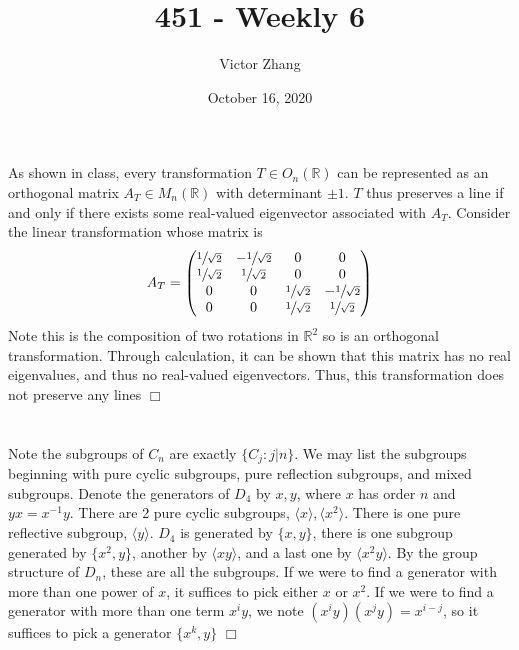 \documentclass{article}
\title{451 - Weekly 6}
\author{Victor Zhang}
\date{October 16, 2020}
\begin{document}
\maketitle

\section{}
As shown in class, every transformation $T \in O_n(\mathbb{R})$ can be represented as an orthogonal matrix $A_T \in M_n(\mathbb{R})$ with determinant $\pm 1$. $T$ thus preserves a line if and only if there exists some real-valued eigenvector associated with $A_T$. Consider the linear transformation whose matrix is
\begin{equation*}
A_T = \left(\begin{matrix}
\sfrac{1}{\sqrt{2}} & -\sfrac{1}{\sqrt{2}} & 0 & 0\\
\sfrac{1}{\sqrt{2}} & \sfrac{1}{\sqrt{2}} & 0 & 0\\
0 & 0 & \sfrac{1}{\sqrt{2}} & -\sfrac{1}{\sqrt{2}}\\
0 & 0 & \sfrac{1}{\sqrt{2}} & \sfrac{1}{\sqrt{2}}\\
\end{matrix}
\right)
\end{equation*}
Note this is the composition of two rotations in $\mathbb{R}^2$ so is an orthogonal transformation. Through calculation, it can be shown that this matrix has no real eigenvalues, and thus no real-valued eigenvectors. Thus, this transformation does not preserve any lines $\Box$

\section{}
Note the subgroups of $C_n$ are exactly $\{C_j : j | n\}$. We may list the subgroups beginning with pure cyclic subgroups, pure reflection subgroups, and mixed subgroups. Denote the generators of $D_4$ by $x,y$, where $x$ has order $n$ and $yx = x^{-1}y$. There are 2 pure cyclic subgroups, $\langle x \rangle, \langle x^2 \rangle$. There is one pure reflective subgroup, $\langle y \rangle$. $D_4$ is generated by $\{x,y\}$, there is one subgroup generated by $\{x^2,y\}$, another by $\langle xy \rangle$, and a last one by $\langle x^2y \rangle$. By the group structure of $D_n$, these are all the subgroups. If we were to find a generator with more than one power of $x$, it suffices to pick either $x$ or $x^2$. If we were to find a generator with more than one term $x^iy$, we note $(x^iy)(x^jy) = x^{i-j}$, so it suffices to pick a generator $\{x^k, y\}$ $\Box$
\end{document}
